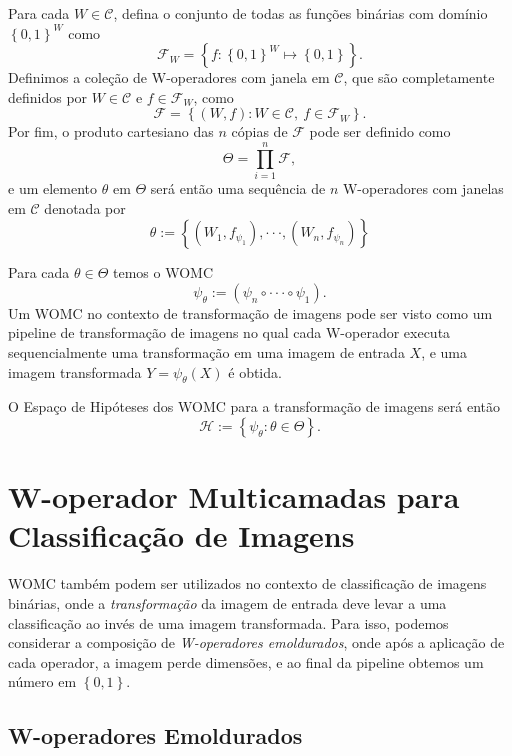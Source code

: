 Para cada $W \in \mathscr{C} $, defina o conjunto de todas as funções binárias com domínio $\left\{ 0,1 \right\}^{W} $ como
$$ \mathcal{F}_{W} = \left\{ f: \left\{ 0,1 \right\}^{W} \mapsto \left\{ 0,1 \right\} \right\}. $$
Definimos a coleção de W-operadores com janela em $ \mathscr{C}$, que são completamente definidos por $W \in \mathscr{C} $ e $f \in \mathcal{F}_{W}$, como
$$\mathcal{F} = \left\{ \left( W,f \right) : W \in \mathscr{C}, \ f \in \mathcal{F}_{W} \right\}. $$
Por fim, o produto cartesiano das $n$ cópias de $\mathcal{F}$ pode ser definido como
$$\Theta = \prod_{i=1}^{n} \mathcal{F}, $$
e um elemento $\theta$ em $\Theta$ será então uma sequência de $n$ W-operadores com janelas em $\mathscr{C}$ denotada por
$$ \theta := \left\{ \left(W_{1}, f_{\psi_{1}} \right), \cdot \cdot \cdot, \left(W_{n}, f_{\psi_{n}} \right) \right\}$$

Para cada $\theta \in \Theta$ temos o WOMC 
\begin{equation}
    \psi_{\theta} := \left( \psi_{n} \circ \cdot \cdot \cdot \circ \psi_{1}  \right).
    \label{eq:multicamadas_1}
\end{equation}
Um WOMC no contexto de transformação de imagens pode ser visto como um pipeline de transformação de imagens no qual cada W-operador executa sequencialmente uma transformação em uma imagem de entrada $X$, e uma imagem transformada $Y = \psi_{\theta} \left( X \right) $ é obtida. 

O Espaço de Hipóteses dos WOMC para a transformação de imagens será então
$$\mathcal{H} := \left\{ \psi_{\theta} : \theta \in \Theta \right\}. $$



\section{W-operador Multicamadas para Classificação de Imagens}

WOMC também podem ser utilizados no contexto de classificação de imagens binárias, onde a \textit{transformação} da imagem de entrada deve levar a uma classificação ao invés de uma imagem transformada. Para isso, podemos considerar a composição de \textit{W-operadores emoldurados}, onde após a aplicação de cada operador, a imagem perde dimensões, e ao final da pipeline obtemos um número em $\left\{ 0,1 \right\}$.

\subsection{W-operadores Emoldurados}

